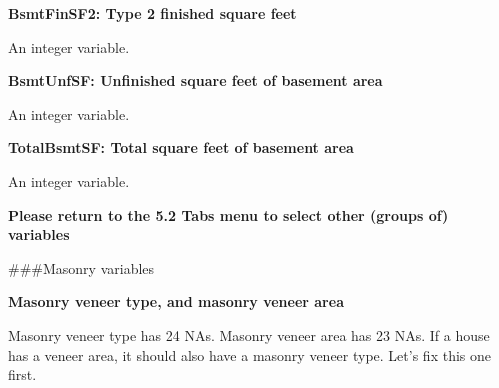 \documentclass[]{article}
\newenvironment{Shaded}{\begin{snugshade}}{\end{snugshade}}
\newcommand{\CommentTok}[1]{\textcolor[rgb]{0.56,0.35,0.01}{\textit{#1}}}
\newcommand{\DecValTok}[1]{\textcolor[rgb]{0.00,0.00,0.81}{#1}}
\newcommand{\KeywordTok}[1]{\textcolor[rgb]{0.13,0.29,0.53}{\textbf{#1}}}
\newcommand{\NormalTok}[1]{#1}
\newcommand{\OperatorTok}[1]{\textcolor[rgb]{0.81,0.36,0.00}{\textbf{#1}}}
\newcommand{\StringTok}[1]{\textcolor[rgb]{0.31,0.60,0.02}{#1}}
\begin{document}
\textbf{BsmtFinSF2: Type 2 finished square feet}

An integer variable.

\begin{Shaded}
\end{Shaded}

\textbf{BsmtUnfSF: Unfinished square feet of basement area}

An integer variable.

\begin{Shaded}
\end{Shaded}

\textbf{TotalBsmtSF: Total square feet of basement area}

An integer variable.

\begin{Shaded}
\end{Shaded}

\textbf{Please return to the 5.2 Tabs menu to select other (groups of)
variables}

\#\#\#Masonry variables

\textbf{Masonry veneer type, and masonry veneer area}

Masonry veneer type has 24 NAs. Masonry veneer area has 23 NAs. If a
house has a veneer area, it should also have a masonry veneer type.
Let's fix this one first.

\begin{Shaded}
\end{Shaded}
\end{document}
